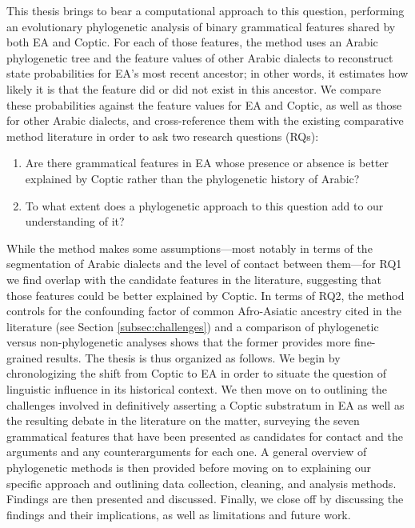 \documentclass[12pt,a4paper]{article}
\begin{document}
This thesis brings to bear a computational approach to this question, performing an evolutionary phylogenetic analysis of binary grammatical features shared by both EA and Coptic. For each of those features, the method uses an Arabic phylogenetic tree and the feature values of other Arabic dialects to reconstruct state probabilities for EA's most recent ancestor; in other words, it estimates how likely it is that the feature did or did not exist in this ancestor. We compare these probabilities against the feature values for EA and Coptic, as well as those for other Arabic dialects, and cross-reference them with the existing comparative method literature in order to ask two research questions (RQs):

\begin{enumerate}
    \item Are there grammatical features in EA whose presence or absence is better explained by Coptic rather than the phylogenetic history of Arabic?
    \item To what extent does a phylogenetic approach to this question add to our understanding of it?
\end{enumerate}

While the method makes some assumptions---most notably in terms of the segmentation of Arabic dialects and the level of contact between them---for RQ1 we find overlap with the candidate features in the literature, suggesting that those features could be better explained by Coptic. In terms of RQ2, the method controls for the confounding factor of common Afro-Asiatic ancestry cited in the literature (see Section \ref{subsec:challenges}) and a comparison of phylogenetic versus non-phylogenetic analyses shows that the former provides more fine-grained results. The thesis is thus organized as follows. We begin by chronologizing the shift from Coptic to EA in order to situate the question of linguistic influence in its historical context. We then move on to outlining the challenges involved in definitively asserting a Coptic substratum in EA as well as the resulting debate in the literature on the matter, surveying the seven grammatical features that have been presented as candidates for contact and the arguments and any counterarguments for each one. A general overview of phylogenetic methods is then provided before moving on to explaining our specific approach and outlining data collection, cleaning, and analysis methods. Findings are then presented and discussed. Finally, we close off by discussing the findings and their implications, as well as limitations and future work.
\end{document}
